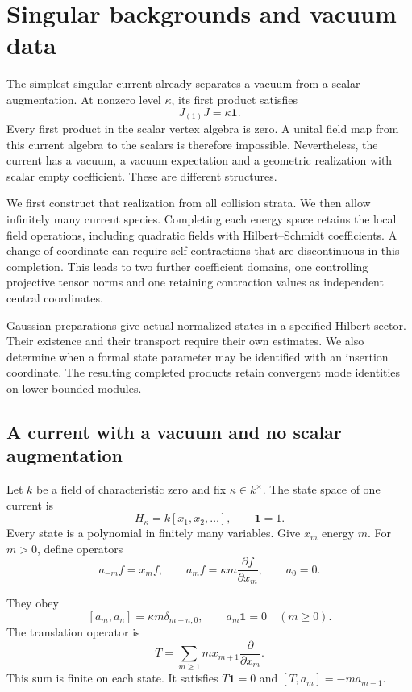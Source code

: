 \chapter{Singular backgrounds and vacuum data}
\label{v4-ch:singular-backgrounds}

The simplest singular current already separates a vacuum
from a scalar augmentation. At nonzero level \(\kappa\),
its first product satisfies
\[
                         J_{(1)}J=\kappa\mathbf1.
\]
Every first product in the scalar vertex algebra is zero.
A unital field map from this current algebra to the
scalars is therefore impossible. Nevertheless, the current
has a vacuum, a vacuum expectation and a geometric
realization with scalar empty coefficient. These are
different structures.

We first construct that realization from all collision
strata. We then allow infinitely many current species.
Completing each energy space retains the local field
operations, including quadratic fields with
Hilbert--Schmidt coefficients. A change of coordinate
can require self-contractions that are discontinuous in
this completion. This leads to two further coefficient
domains, one controlling projective tensor norms and
one retaining contraction values as independent central
coordinates.

Gaussian preparations give actual
normalized states in a specified Hilbert sector. Their
existence and their transport require their own estimates.
We also determine when a formal state parameter may be
identified with an insertion coordinate. The resulting
completed products retain convergent mode identities
on lower-bounded modules.

\section{A current with a vacuum and no scalar augmentation}
\label{v4-sec:singular-heisenberg}

Let \(k\) be a field of characteristic zero and fix
\(\kappa\in k^\times\). The state space of one current is
\[
 H_\kappa=k[x_1,x_2,\ldots],\qquad \mathbf1=1.
\]
Every state is a polynomial in finitely many variables.
Give \(x_m\) energy \(m\). For \(m>0\), define operators
\[
 a_{-m}f=x_mf,\qquad
 a_mf=\kappa m\frac{\partial f}{\partial x_m},
 \qquad a_0=0.
\]

They obey
\begin{equation}\label{v4-eq:singular-CCR}
 [a_m,a_n]=\kappa m\delta_{m+n,0},
 \qquad a_m\mathbf1=0\quad(m\geq0).
\end{equation}
The translation operator is
\[
 T=\sum_{m\geq1}m x_{m+1}\frac{\partial}{\partial x_m}.
\]
This sum is finite on each state. It satisfies
\(T\mathbf1=0\) and \([T,a_m]=-m a_{m-1}\).

